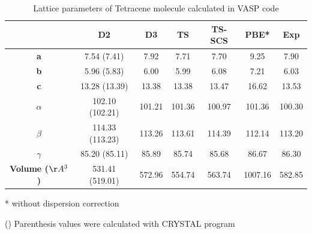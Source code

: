  \begin{table}[htb]
 	\caption{Lattice parameters of Tetracene molecule calculated in VASP code} \label{table13}
 	\begin{center}
 	\begin{threeparttable}
 		\begin{tabular}{c c c c c c c}
 			\toprule
 			 & \textbf{D2} & \textbf{D3} & \textbf{TS} & \textbf{TS-SCS} & \textbf{PBE*} & \textbf{Exp} \\
 			 \midrule
 			 \textbf{a} &7.54 (7.41) &  7.92 & 7.71 & 7.70 & 9.25 & 7.90\\
 			 \textbf{b}& 5.96 (5.83) & 6.00 & 5.99 & 6.08 & 7.21 & 6.03 \\
 			 \textbf{c}& 13.28 (13.39) & 13.38 & 13.38 & 13.47 & 16.62 & 13.53 \\
 			 \textbf{$\alpha$} & 102.10 (102.21) & 101.21 & 101.36 & 100.97 & 101.36 &100.30\\
 			 \textbf{$\beta$} & 114.33 (113.23) & 113.26 & 113.61 & 114.39 & 112.14 & 113.20\\
 			 \textbf{$\gamma$} &85.20 (85.11) & 85.89 & 85.74 & 85.68 & 86.67 & 86.30\\
 			 \textbf{Volume ($\AA^{3}$)} & 531.41 (519.01) & 572.96 & 554.74 &  563.74 & 1007.16 & 582.85\\
 			 \bottomrule
 		\end{tabular} 
 		
 		\begin{tablenotes}
 			\item[*] without dispersion correction
 			\item[()] Parenthesis values were calculated with CRYSTAL program
 		\end{tablenotes}
 	\end{threeparttable}
 	\end{center}
 \end{table}
 
